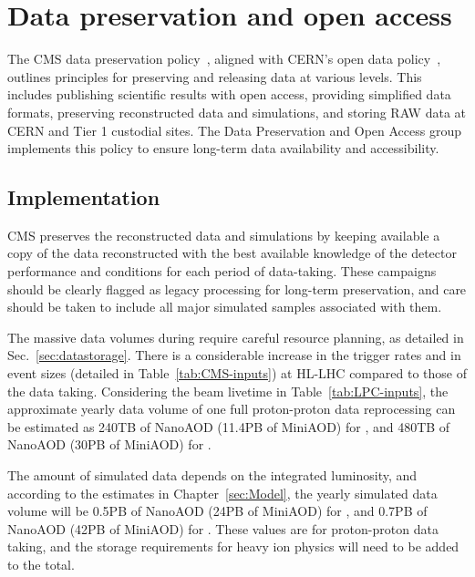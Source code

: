 %
%
% 
\section{Data preservation and open access}
\label{sec:Preservation}

The CMS data preservation policy~\cite{CMS:2020data}, aligned with CERN's open data policy~\cite{CERN2020OpenData}, outlines principles for preserving and releasing data at various levels. This includes publishing scientific results with open access, providing simplified data formats, preserving reconstructed data and simulations, and storing \gls{RAW} data at CERN and Tier 1 custodial sites. The Data Preservation and Open Access group implements this policy to ensure long-term data availability and accessibility.

\subsection{Implementation}
\label{sec:pres-implement}

CMS preserves the reconstructed data and simulations by keeping available a copy of the data reconstructed with the best available knowledge of the detector performance and conditions for each period of data-taking. These campaigns should be clearly flagged as legacy processing for long-term preservation, and care should be taken to include all major simulated samples associated with them.

The massive data volumes during \PhaseTwo require careful resource planning, as detailed in Sec.~\ref{sec:datastorage}. There is a considerable increase in the trigger rates and in event sizes (detailed in Table~\ref{tab:CMS-inputs}) at HL-LHC compared to those of the \PhaseOne data taking. Considering the beam livetime in Table~\ref{tab:LPC-inputs}, the approximate yearly data volume of one full proton-proton data reprocessing can be estimated as 240\unit{TB} of NanoAOD (11.4\unit{PB} of MiniAOD) for \RunFour, and 480\unit{TB} of NanoAOD (30\unit{PB} of MiniAOD) for \RunFive.

The amount of simulated data depends on the integrated luminosity, and according to the estimates in Chapter~\ref{sec:Model}, the yearly simulated data volume will be 0.5\unit{PB} of NanoAOD (24\unit{PB} of MiniAOD) for \RunFour, and  0.7\unit{PB} of NanoAOD (42\unit{PB} of MiniAOD) for \RunFive. These values are for proton-proton data taking, and the storage requirements for heavy ion physics will need to be added to the total.


